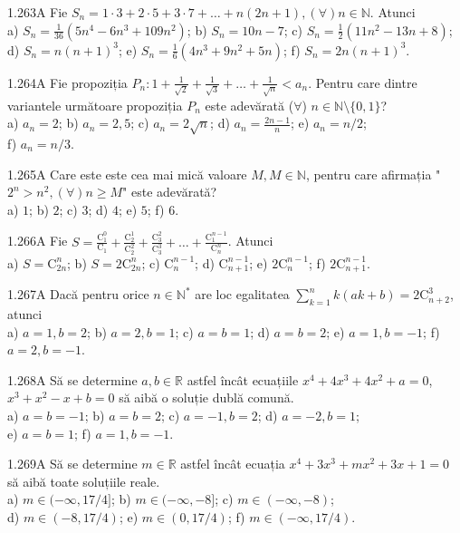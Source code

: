\documentclass[11pt]{article}
\begin{document}
1.263A Fie $S_{n}=1 \cdot 3+2 \cdot 5+3 \cdot 7+\ldots+n(2 n+1),(\forall) n \in \mathbb{N}$. Atunci\\ a) $S_{n}=\frac{1}{36}\left(5 n^{4}-6 n^{3}+109 n^{2}\right)$; b) $S_{n}=10 n-7$; c) $S_{n}=\frac{1}{2}\left(11 n^{2}-13 n+8\right)$; d) $S_{n}=n(n+1)^{3}$; e) $S_{n}=\frac{1}{6}\left(4 n^{3}+9 n^{2}+5 n\right)$; f) $S_{n}=2 n(n+1)^{3}$.

1.264A Fie propoziția $P_{n}: 1+\frac{1}{\sqrt{2}}+\frac{1}{\sqrt{3}}+\ldots+\frac{1}{\sqrt{n}}<a_{n}$. Pentru care dintre variantele următoare propoziția $P_{n}$ este adevărată ($\forall$) $n \in \mathbb{N} \setminus\{0,1\}$?\\ a) $a_{n}=2$; b) $a_{n}=2,5$; c) $a_{n}=2 \sqrt{n}$; d) $a_{n}=\frac{2 n-1}{n}$; e) $a_{n}=n / 2$;\\ f) $a_{n}=n / 3$.

1.265A Care este este cea mai mică valoare $M, M \in \mathbb{N}$, pentru care afirmația "$2^{n}>n^{2},(\forall) n \geq M$" este adevărată?\\ a) $1$; b) $2$; c) $3$; d) $4$; e) $5$; f) $6$.

1.266A Fie $S=\frac{\mathrm{C}_{1}^{0}}{\mathrm{C}_{1}}+\frac{\mathrm{C}_{2}^{1}}{\mathrm{C}_{2}^{2}}+\frac{\mathrm{C}_{3}^{2}}{\mathrm{C}_{3}^{3}}+\ldots+\frac{\mathrm{C}_{1}^{n-1}}{\mathrm{C}_{n}^{n}}$. Atunci\\ a) $S=\mathrm{C}_{2 n}^{n}$; b) $S=2 \mathrm{C}_{2 n}^{n}$; c) $\mathrm{C}_{n}^{n-1}$; d) $\mathrm{C}_{n+1}^{n-1}$; e) $2 \mathrm{C}_{n}^{n-1}$; f) $2 \mathrm{C}_{n+1}^{n-1}$.

1.267A Dacă pentru orice $n \in \mathbb{N}^{*}$ are loc egalitatea $\sum_{k=1}^{n} k(a k+b)=2 \mathrm{C}_{n+2}^{3}$, atunci\\ a) $a=1, b=2$; b) $a=2, b=1$; c) $a=b=1$; d) $a=b=2$; e) $a=1, b=-1$; f) $a=2, b=-1$.

1.268A Să se determine $a, b \in \mathbb{R}$ astfel încât ecuațiile $x^{4}+4 x^{3}+4 x^{2}+a=0$, $x^{3}+x^{2}-x+b=0$ să aibă o soluție dublă comună.\\ a) $a=b=-1$; b) $a=b=2$; c) $a=-1, b=2$; d) $a=-2, b=1$;\\ e) $a=b=1$; f) $a=1, b=-1$.

1.269A Să se determine $m \in \mathbb{R}$ astfel încât ecuația $x^{4}+3 x^{3}+m x^{2}+3 x+1=0$ să aibă toate soluțiile reale.\\ a) $m \in(-\infty, 17 / 4]$; b) $m \in(-\infty,-8]$; c) $m \in(-\infty,-8)$;\\ d) $m \in(-8,17 / 4)$; e) $m \in(0,17 / 4)$; f) $m \in(-\infty, 17 / 4)$.
\end{document}
